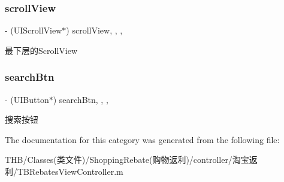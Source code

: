 \subsubsection{\texorpdfstring{scroll\+View}{scrollView}}
{\footnotesize\ttfamily -\/ (U\+I\+Scroll\+View$\ast$) scroll\+View\hspace{0.3cm}{\ttfamily [read]}, {\ttfamily [write]}, {\ttfamily [nonatomic]}, {\ttfamily [strong]}}

最下层的\+Scroll\+View \mbox{\label{category_t_b_rebates_view_controller_07_08_a74998266b9c7d278f85de0320cc6a0b5}} 
\subsubsection{\texorpdfstring{search\+Btn}{searchBtn}}
{\footnotesize\ttfamily -\/ (U\+I\+Button$\ast$) search\+Btn\hspace{0.3cm}{\ttfamily [read]}, {\ttfamily [write]}, {\ttfamily [nonatomic]}, {\ttfamily [strong]}}

搜索按钮 

The documentation for this category was generated from the following file\+:\begin{DoxyCompactItemize}
\item 
T\+H\+B/\+Classes(类文件)/\+Shopping\+Rebate(购物返利)/controller/淘宝返利/T\+B\+Rebates\+View\+Controller.\+m\end{DoxyCompactItemize}
